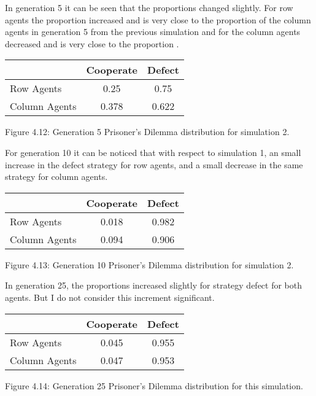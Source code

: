 \documentclass{article}
\begin{document}
In generation 5 it can be seen that the proportions changed slightly. For row agents the proportion increased and is very close to the proportion of the column agents in generation 5 from the previous simulation and for the column agents decreased and is very close to the proportion . 
\begin{center}
\begin{tabular}{|l|c|c|}
\hline
& Cooperate & Defect \\ 
\hline
Row Agents & 0.25 & 0.75\\
\hline
Column Agents & 0.378 & 0.622\\
\hline
\end{tabular}
\end{center}
\begin{center}
Figure 4.12: Generation 5 Prisoner’s Dilemma distribution for simulation 2.
\end{center}

For generation 10 it can be noticed that with respect to simulation 1, an small increase in the defect strategy for row agents, and a small decrease in the same strategy for column agents. 
\begin{center}
\begin{tabular}{|l|c|c|}
\hline
& Cooperate & Defect \\ 
\hline
Row Agents & 0.018 & 0.982\\
\hline
Column Agents & 0.094 & 0.906\\
\hline
\end{tabular}
\end{center}
\begin{center}
Figure 4.13: Generation 10 Prisoner’s Dilemma distribution for simulation 2.
\end{center}

In generation 25, the proportions increased slightly for strategy defect for both agents. But I do not consider this increment significant.
\begin{center}
\begin{tabular}{|l|c|c|}
\hline
& Cooperate & Defect \\ 
\hline
Row Agents & 0.045 & 0.955\\
\hline
Column Agents & 0.047 & 0.953\\
\hline
\end{tabular}
\end{center}
\begin{center}
Figure 4.14: Generation 25 Prisoner’s Dilemma distribution for this simulation.
\end{center}
\end{document}
